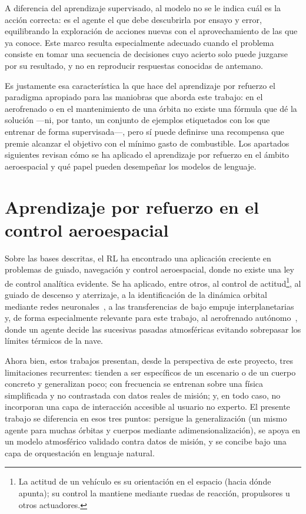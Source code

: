 {A diferencia del aprendizaje supervisado, al modelo no se le indica cuál es la acción correcta: es el agente el que debe descubrirla por ensayo y error, equilibrando la exploración de acciones nuevas con el aprovechamiento de las que ya conoce. Este marco resulta especialmente adecuado cuando el problema consiste en tomar una secuencia de decisiones cuyo acierto solo puede juzgarse por su resultado, y no en reproducir respuestas conocidas de antemano.

Es justamente esa característica la que hace del aprendizaje por refuerzo el paradigma apropiado para las maniobras que aborda este trabajo: en el aerofrenado o en el mantenimiento de una órbita no existe una fórmula que dé la solución ---ni, por tanto, un conjunto de ejemplos etiquetados con los que entrenar de forma supervisada---, pero sí puede definirse una recompensa que premie alcanzar el objetivo con el mínimo gasto de combustible. Los apartados siguientes revisan cómo se ha aplicado el aprendizaje por refuerzo en el ámbito aeroespacial y qué papel pueden desempeñar los modelos de lenguaje.

\section{Aprendizaje por refuerzo en el control aeroespacial}
\label{sec:mot-rl}

Sobre las bases descritas, el \gls{RL} ha encontrado una aplicación creciente en problemas de guiado, navegación y control aeroespacial, donde no existe una ley de control analítica evidente. Se ha aplicado, entre otros, al control de actitud\footnote{La actitud de un vehículo es su orientación en el espacio (hacia dónde apunta); su control la mantiene mediante ruedas de reacción, propulsores u otros actuadores.}, al guiado de descenso y aterrizaje, a la identificación de la dinámica orbital mediante redes neuronales~\cite{gueho2019}, a las transferencias de bajo empuje interplanetarias~\cite{zavoli2020} y, de forma especialmente relevante para este trabajo, al aerofrenado autónomo~\cite{falcone2023}, donde un agente decide las sucesivas pasadas atmosféricas evitando sobrepasar los límites térmicos de la nave.

Ahora bien, estos trabajos presentan, desde la perspectiva de este proyecto, tres limitaciones recurrentes: tienden a ser específicos de un escenario o de un cuerpo concreto y generalizan poco; con frecuencia se entrenan sobre una física simplificada y no contrastada con datos reales de misión; y, en todo caso, no incorporan una capa de interacción accesible al usuario no experto. El presente trabajo se diferencia en esos tres puntos: persigue la generalización (un mismo agente para muchas órbitas y cuerpos mediante adimensionalización), se apoya en un modelo atmosférico validado contra datos de misión, y se concibe bajo una capa de orquestación en lenguaje natural.

}
